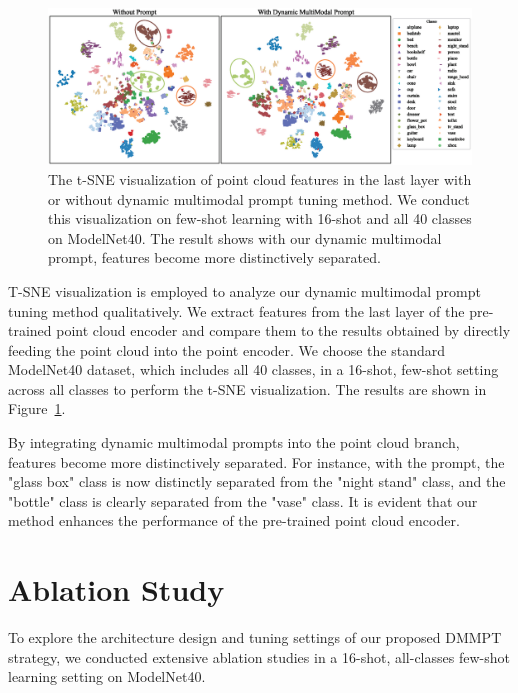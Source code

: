 \documentclass{ecai}
\begin{document}
\begin{figure}[ht]
\centerline{\includegraphics[width=0.9\linewidth]{TSNE.eps}}
\caption{The t-SNE visualization of point cloud features in the last layer with or without dynamic multimodal prompt tuning method. We conduct this visualization on few-shot learning with 16-shot and all 40 classes on ModelNet40. The result shows with our dynamic multimodal prompt, features become more distinctively separated.}\label{tsne}
\vspace{4pt}
\end{figure}
T-SNE visualization is employed to analyze our dynamic multimodal prompt tuning method qualitatively. We extract features from the last layer of the pre-trained point cloud encoder and compare them to the results obtained by directly feeding the point cloud into the point encoder. We choose the standard ModelNet40 dataset, which includes all 40 classes, in a 16-shot, few-shot setting across all classes to perform the t-SNE visualization. The results are shown in Figure~\ref{tsne}.

By integrating dynamic multimodal prompts into the point cloud branch, features become more distinctively separated. For instance, with the prompt, the "glass box" class is now distinctly separated from the "night stand" class, and the "bottle" class is clearly separated from the "vase" class. It is evident that our method enhances the performance of the pre-trained point cloud encoder. 


\section{Ablation Study}\label{ablation}
To explore the architecture design and tuning settings of our proposed DMMPT strategy, we conducted extensive ablation studies in a 16-shot, all-classes few-shot learning setting on ModelNet40.
\end{document}
